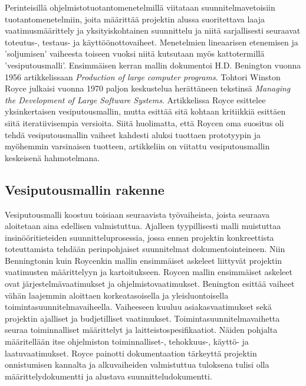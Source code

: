 \documentclass[finnish,12pt]{tktltiki2}
\theoremstyle{definition}
\theoremstyle{remark}
\begin{document}
Perinteisillä ohjelmistotuotantomenetelmillä viitataan suunnitelmavetoisiin tuotantomenetelmiin, joita määrittää projektin alussa suoritettava laaja vaatimusmäärittely ja yksityiskohtainen suunnittelu ja niitä sarjallisesti seuraavat toteutus-, testaus- ja käyttöönottovaiheet. Menetelmien lineaarisen etenemisen ja 'soljumisen' vaiheesta toiseen vuoksi niitä kutsutaan myös kattotermillä 'vesiputousmalli'. Ensimmäisen kerran mallin dokumentoi H.D. Benington vuonna 1956 artikkelissaan \textit{Production of large computer programs}. \cite{Ruparelia:2010:SDL:1764810.1764814, Benington:1987:PLC:41765.41799} Tohtori Winston Royce julkaisi vuonna 1970 paljon keskustelua herättäneen tekstinsä \textit{Managing the Development of Large Software Systems}. Artikkelissa Royce esittelee yksinkertaisen vesiputousmallin, mutta esittää sitä kohtaan kritiikkiä esittäen siitä iteratiivisempia versioita. Siitä huolimatta, että Roycen oma suositus oli tehdä vesiputousmallin vaiheet kahdesti aluksi tuottaen prototyypin ja myöhemmin varsinaisen tuotteen, artikkeliin on viitattu vesiputousmallin keskeisenä hahmotelmana.

\subsection{Vesiputousmallin rakenne}

Vesiputousmalli koostuu toisiaan seuraavista työvaiheista, joista seuraava aloitetaan aina edellisen valmistuttua. Ajalleen tyypillisesti malli muistuttaa insinööritieteiden suunnitteluprosessia, jossa ennen projektin konkreettista toteuttamista tehdään perinpohjaiset suunnitelmat dokumentointeineen. Niin Benningtonin kuin Roycenkin mallin ensimmäiset askeleet liittyvät projektin vaatimusten määrittelyyn ja kartoitukseen. Roycen mallin ensimmäiset askeleet ovat järjestelmävaatimukset ja ohjelmistovaatimukset\cite{Royce1970}. Benington esittää vaiheet vähän laajemmin aloittaen korkeatasoisella ja yleisluontoisella toimintasuunnitelmavaiheella. Vaiheeseen kuuluu asiakasvaatimukset sekä projektin ajalliset ja budjetilliset vaatimukset. Toimintasuunnitelmavaihetta seuraa toiminnalliset määrittelyt ja laitteistospesifikaatiot. \cite{Benington:1987:PLC:41765.41799} Näiden pohjalta määritellään itse ohjelmiston toiminnalliset-, tehokkuus-, käyttö- ja laatuvaatimukset. Royce painotti dokumentaation tärkeyttä projektin onnistumisen kannalta ja alkuvaiheiden valmistuttua tuloksena tulisi olla määrittelydokumentti ja alustava suunnitteludokumentti. 
\end{document}
